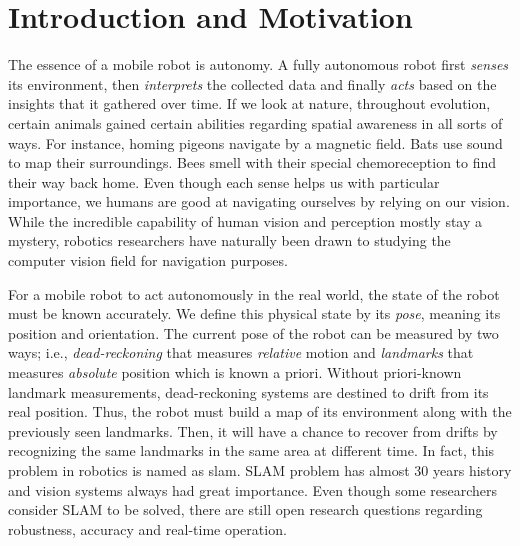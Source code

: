 \documentclass[12pt]{report}
\numberwithin{figure}{section}
\begin{document}
\newpage



\tableofcontents
\cleardoublepage
\setcounter{page}{1}
\listoffigures
{}
\listoftables
{}
\newpage
\printnoidxglossary[type=acronym,title={List of Abbreviations}]
\printnoidxglossary[title=List of Notations,sort=def]
\glsaddallunused
\printacronyms
\newpage


\chapter{Introduction and Motivation} \label{cp_intro}

The essence of a mobile robot is autonomy. 
A fully autonomous robot first \textit{senses} its environment, then 
\textit{interprets} the collected data and finally \textit{acts} based on the insights 
that it gathered over time.
If we look at nature, throughout evolution, 
certain animals gained certain abilities regarding 
spatial awareness in all sorts of ways. For instance, 
homing pigeons navigate by a magnetic field. Bats use sound to map their 
surroundings. Bees smell with their special chemoreception to find their way 
back home. 
Even though each sense helps us with particular importance,
we humans are good at navigating ourselves by relying on our vision. 
While the incredible capability of human vision and perception 
mostly stay a mystery, 
robotics researchers have naturally been drawn to studying 
the computer vision field for navigation purposes.


For a mobile robot to act autonomously in the real world, the state of the
robot must be known accurately. We define this physical state by its
\textit{pose}, meaning its position and orientation. The current pose of the
robot can be measured by two ways; i.e., \textit{dead-reckoning} that measures
\textit{relative} motion and \textit{landmarks} that measures \textit{absolute}
position which is known a priori.  Without priori-known landmark measurements,
dead-reckoning systems are destined to drift from its real position. Thus, the
robot must build a map of its environment along with the previously seen
landmarks. Then, it will have a chance to recover from drifts by recognizing
the same landmarks in the same area at different time. In fact, this problem in
robotics is named as \acrfull{slam}. SLAM problem has almost 30 years history
\parencite{Moravec1980} and vision systems always had great importance. Even 
though
some researchers \parencite{Frese2010} consider SLAM to be solved, there are 
still
open research questions regarding robustness, accuracy and real-time operation.
\end{document}

